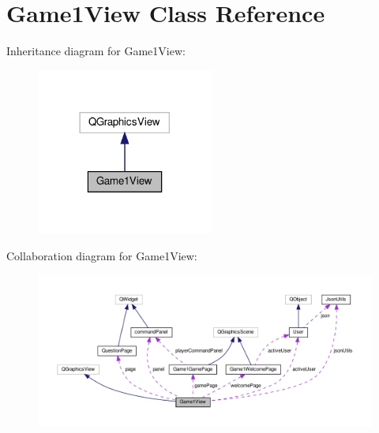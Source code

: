 \hypertarget{classGame1View}{}\section{Game1\+View Class Reference}
\label{classGame1View}


Inheritance diagram for Game1\+View\+:
\nopagebreak
\begin{figure}[H]
\begin{center}
\leavevmode
\includegraphics[width=165pt]{classGame1View__inherit__graph}
\end{center}
\end{figure}


Collaboration diagram for Game1\+View\+:
\nopagebreak
\begin{figure}[H]
\begin{center}
\leavevmode
\includegraphics[width=350pt]{classGame1View__coll__graph}
\end{center}
\end{figure}

